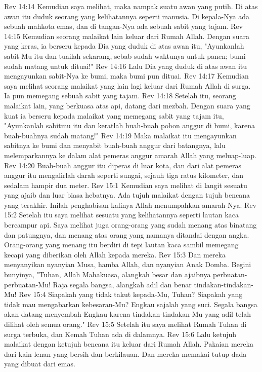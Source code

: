 Rev 14:14  Kemudian saya melihat, maka nampak suatu awan yang putih. Di atas awan itu duduk seorang yang kelihatannya seperti manusia. Di kepala-Nya ada sebuah mahkota emas, dan di tangan-Nya ada sebuah sabit yang tajam.
Rev 14:15  Kemudian seorang malaikat lain keluar dari Rumah Allah. Dengan suara yang keras, ia berseru kepada Dia yang duduk di atas awan itu, "Ayunkanlah sabit-Mu itu dan tuailah sekarang, sebab sudah waktunya untuk panen; bumi sudah matang untuk dituai!"
Rev 14:16  Lalu Dia yang duduk di atas awan itu mengayunkan sabit-Nya ke bumi, maka bumi pun dituai.
Rev 14:17  Kemudian saya melihat seorang malaikat yang lain lagi keluar dari Rumah Allah di surga. Ia pun memegang sebuah sabit yang tajam.
Rev 14:18  Setelah itu, seorang malaikat lain, yang berkuasa atas api, datang dari mezbah. Dengan suara yang kuat ia berseru kepada malaikat yang memegang sabit yang tajam itu, "Ayunkanlah sabitmu itu dan keratlah buah-buah pohon anggur di bumi, karena buah-buahnya sudah matang!"
Rev 14:19  Maka malaikat itu mengayunkan sabitnya ke bumi dan menyabit buah-buah anggur dari batangnya, lalu melemparkannya ke dalam alat pemeras anggur amarah Allah yang meluap-luap.
Rev 14:20  Buah-buah anggur itu diperas di luar kota, dan dari alat pemeras anggur itu mengalirlah darah seperti sungai, sejauh tiga ratus kilometer, dan sedalam hampir dua meter.
Rev 15:1  Kemudian saya melihat di langit sesuatu yang ajaib dan luar biasa hebatnya. Ada tujuh malaikat dengan tujuh bencana yang terakhir. Inilah penghabisan kalinya Allah menumpahkan amarah-Nya.
Rev 15:2  Setelah itu saya melihat sesuatu yang kelihatannya seperti lautan kaca bercampur api. Saya melihat juga orang-orang yang sudah menang atas binatang dan patungnya, dan menang atas orang yang namanya ditandai dengan angka. Orang-orang yang menang itu berdiri di tepi lautan kaca sambil memegang kecapi yang diberikan oleh Allah kepada mereka.
Rev 15:3  Dan mereka menyanyikan nyanyian Musa, hamba Allah, dan nyanyian Anak Domba. Begini bunyinya, "Tuhan, Allah Mahakuasa, alangkah besar dan ajaibnya perbuatan-perbuatan-Mu! Raja segala bangsa, alangkah adil dan benar tindakan-tindakan-Mu!
Rev 15:4  Siapakah yang tidak takut kepada-Mu, Tuhan? Siapakah yang tidak mau mengabarkan kebesaran-Mu? Engkau sajalah yang suci. Segala bangsa akan datang menyembah Engkau karena tindakan-tindakan-Mu yang adil telah dilihat oleh semua orang."
Rev 15:5  Setelah itu saya melihat Rumah Tuhan di surga terbuka, dan Kemah Tuhan ada di dalamnya.
Rev 15:6  Lalu ketujuh malaikat dengan ketujuh bencana itu keluar dari Rumah Allah. Pakaian mereka dari kain lenan yang bersih dan berkilauan. Dan mereka memakai tutup dada yang dibuat dari emas.
